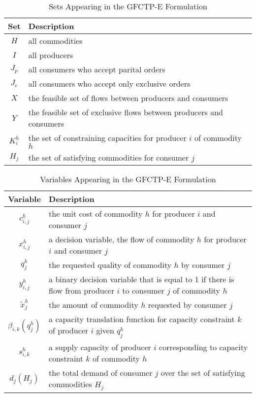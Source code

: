 \begin{table} [h!]
\centering
\begin{tabularx}{\columnwidth-10pt}{|c|X|} %
\hline
Set         & Description \\
\hline
$H$         & all commodities  \\
$I$         & all producers  \\
$J_{p}$     & all consumers who accept parital orders  \\
$J_{e}$     & all consumers who accept only exclusive orders  \\
$X$         & the feasible set of flows between producers and consumers  \\
$Y$         & the feasible set of exclusive flows between 
            producers and consumers  \\
$K_{i}^{h}$ & the set of constraining capacities for 
            producer $i$ of commodity $h$  \\
$H_{j}$     & the set of satisfying commodities for consumer $j$  \\
\hline
\end{tabularx}
\caption{Sets Appearing in the GFCTP-E Formulation}
\label{tbl:GFCTP-E-sets}
\end{table}

\begin{table} [h!]
\centering
\begin{tabularx}{\columnwidth-10pt}{|c|X|} %
\hline
Variable    & Description \\
\hline
$c_{i,j}^{h}$             & the unit cost of commodity $h$ 
                          for producer $i$ and consumer $j$  \\
$x_{i,j}^{h}$             & a decision variable, the flow of commodity $h$ 
                          for producer $i$ and consumer $j$  \\
$q_{j}^{h}$               & the requested quality of commodity $h$ 
                          by consumer $j$  \\
$y_{i,j}^{h}$             & a binary decision variable that is equal to 1 if 
                          there is flow from producer $i$ to consumer $j$ of 
                          commodity $h$ \\
$\tilde{x}_{j}^{h}$       & the amount of commodity $h$ requested by 
                          consumer $j$ \\
$\beta_{i,k}(q_{j}^{h})$  & a capacity translation function for capacity 
                          constraint $k$ of producer $i$ given $q_{j}^{h}$ \\
$s_{i,k}^{h}$             & a supply capacity of producer $i$ corresponding to 
                          capacity constraint $k$ of commodity $h$ \\
$d_{j}(H_{j})$            & the total demand of consumer $j$ over the set of 
                          satisfying commodities $H_{j}$ \\
\hline
\end{tabularx}
\caption{Variables Appearing in the GFCTP-E Formulation}
\label{tbl:GFCTP-E-vars}
\end{table}

